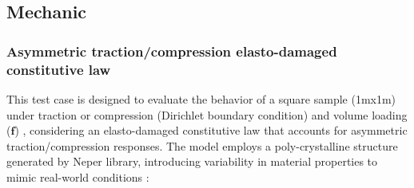 \documentclass[12pt]{article}
\newcommand{\vm}[1]{
	{\ensuremath{\mathbf{#1}}}
}
\begin{document}
\subsection{Mechanic}
\subsubsection{Asymmetric traction/compression elasto-damaged constitutive law}\label{expl1}

This test case is designed to evaluate the behavior of a square sample (1mx1m) under traction or compression (Dirichlet boundary condition) and volume loading ($\vm{f}$)
, considering an elasto-damaged constitutive law that accounts for asymmetric traction/compression responses. The model employs a poly-crystalline structure generated by Neper library\cite{Neper,QUEY20111729}, introducing variability in material properties to mimic real-world conditions :
\end{document}
